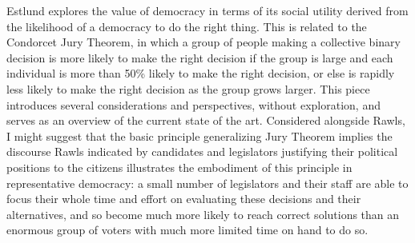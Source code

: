 Estlund explores the value of democracy in terms of its social utility derived from the likelihood of a democracy to do the right thing.  This is related to the Condorcet Jury Theorem, in which a group of people making a collective binary decision is more likely to make the right decision if the group is large and each individual is more than 50\% likely to make the right decision, or else is rapidly less likely to make the right decision as the group grows larger.  This piece introduces several considerations and perspectives, without exploration, and serves as an overview of the current state of the art.  Considered alongside Rawls, I might suggest that the basic principle generalizing Jury Theorem implies the discourse Rawls indicated by candidates and legislators justifying their political positions to the citizens illustrates the embodiment of this principle in representative democracy:  a small number of legislators and their staff are able to focus their whole time and effort on evaluating these decisions and their alternatives, and so become much more likely to reach correct solutions than an enormous group of voters with much more limited time on hand to do so.
